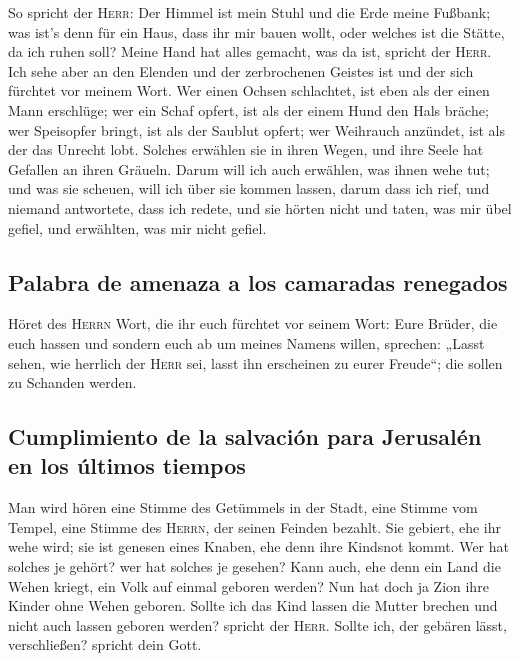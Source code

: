  So spricht der \textsc{Herr}: Der Himmel ist mein Stuhl
und die Erde meine Fußbank; was ist's denn für ein Haus, dass ihr mir
bauen wollt, oder welches ist die Stätte, da ich ruhen soll?
 Meine Hand hat alles gemacht, was da ist, spricht der
\textsc{Herr}. Ich sehe aber an den Elenden und der zerbrochenen Geistes
ist und der sich fürchtet vor meinem Wort.  Wer einen
Ochsen schlachtet, ist eben als der einen Mann erschlüge; wer ein Schaf
opfert, ist als der einem Hund den Hals bräche; wer Speisopfer bringt,
ist als der Saublut opfert; wer Weihrauch anzündet, ist als der das
Unrecht lobt. Solches erwählen sie in ihren Wegen, und ihre Seele hat
Gefallen an ihren Gräueln.  Darum will ich auch erwählen,
was ihnen wehe tut; und was sie scheuen, will ich über sie kommen
lassen, darum dass ich rief, und niemand antwortete, dass ich redete,
und sie hörten nicht und taten, was mir übel gefiel, und erwählten, was
mir nicht gefiel.

\hypertarget{palabra-de-amenaza-a-los-camaradas-renegados}{%
\subsection{Palabra de amenaza a los camaradas
renegados}\label{palabra-de-amenaza-a-los-camaradas-renegados}}

 Höret des \textsc{Herrn} Wort, die ihr euch fürchtet vor
seinem Wort: Eure Brüder, die euch hassen und sondern euch ab um meines
Namens willen, sprechen: „Lasst sehen, wie herrlich der \textsc{Herr}
sei, lasst ihn erscheinen zu eurer Freude``; die sollen zu Schanden
werden.

\hypertarget{cumplimiento-de-la-salvaciuxf3n-para-jerusaluxe9n-en-los-uxfaltimos-tiempos}{%
\subsection{Cumplimiento de la salvación para Jerusalén en los últimos
tiempos}\label{cumplimiento-de-la-salvaciuxf3n-para-jerusaluxe9n-en-los-uxfaltimos-tiempos}}

 Man wird hören eine Stimme des Getümmels in der Stadt,
eine Stimme vom Tempel, eine Stimme des \textsc{Herrn}, der seinen
Feinden bezahlt.  Sie gebiert, ehe ihr wehe wird; sie ist
genesen eines Knaben, ehe denn ihre Kindsnot kommt.  Wer
hat solches je gehört? wer hat solches je gesehen? Kann auch, ehe denn
ein Land die Wehen kriegt, ein Volk auf einmal geboren werden? Nun hat
doch ja Zion ihre Kinder ohne Wehen geboren.  Sollte ich
das Kind lassen die Mutter brechen und nicht auch lassen geboren werden?
spricht der \textsc{Herr}. Sollte ich, der gebären lässt, verschließen?
spricht dein Gott.

